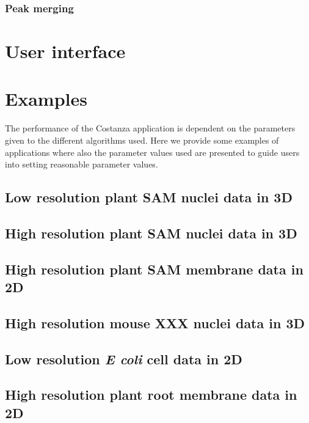\documentclass[a4paper,12pt]{article}
\begin{document}
\subsubsection{Peak merging}

\section{User interface}

\section{Examples}

The performance of the Costanza application is dependent on the
parameters given to the different algorithms used. Here we provide
some examples of applications where also the parameter values used are
presented to guide users into setting reasonable parameter values.

\subsection{Low resolution plant SAM nuclei data in 3D}

\subsection{High resolution plant SAM nuclei data in 3D}

\subsection{High resolution plant SAM membrane data in 2D}

\subsection{High resolution mouse XXX nuclei data in 3D}

\subsection{Low resolution \textit{E coli} cell data in 2D}

\subsection{High resolution plant root membrane data in 2D}



\end{document}
